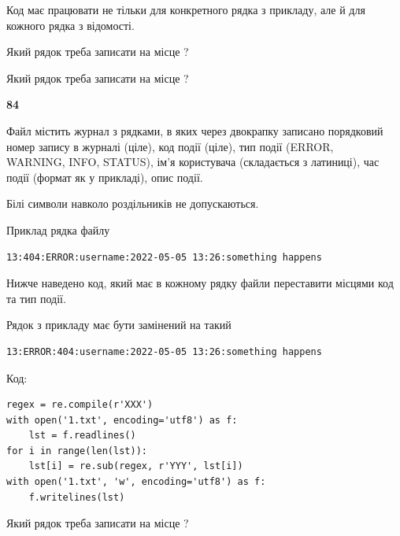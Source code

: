 Код має працювати не тільки для конкретного рядка з прикладу, але й для кожного рядка з відомості.




Який рядок треба записати на місце  ?\par
\vspace{5mm}


Який рядок треба записати на місце  ?\par


\newpage

{\begin {center}\textbf{ 84}\end {center}}\par
Файл  містить журнал з рядками, в яких через двокрапку записано поряд\-ко\-вий номер запису в журналі (ціле), код події (ціле), тип події (ERROR,\\ WARNING, INFO, STATUS), ім'я користувача (складається з латиниці), час події (фор\-мат як у прикладі), опис події.

Білі символи навколо роздільників не допускаються.

Приклад рядка файлу



\begin{verbatim}
13:404:ERROR:username:2022-05-05 13:26:something happens
\end{verbatim}


Нижче наведено код, який має в кожному рядку файли переставити місцями код та тип події.

Рядок з прикладу має бути замінений на такий



\begin{verbatim}
13:ERROR:404:username:2022-05-05 13:26:something happens
\end{verbatim}




Код:



\begin{verbatim}
regex = re.compile(r'XXX')
with open('1.txt', encoding='utf8') as f:
    lst = f.readlines()
for i in range(len(lst)):
    lst[i] = re.sub(regex, r'YYY', lst[i])
with open('1.txt', 'w', encoding='utf8') as f:
    f.writelines(lst)
\end{verbatim}







Який рядок треба записати на місце  ?\par
\vspace{5mm}


